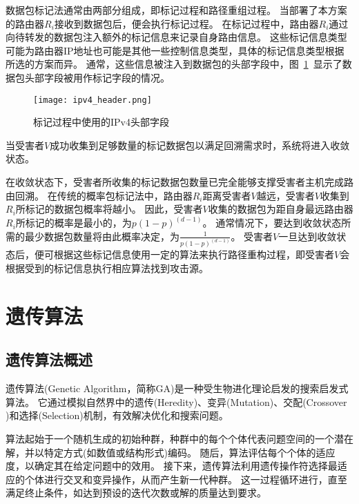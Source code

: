 


数据包标记法通常由两部分组成，即标记过程和路径重组过程。
当部署了本方案的路由器$R_i$接收到数据包后，便会执行标记过程。
在标记过程中，路由器$R_i$通过向待转发的数据包注入额外的标记信息来记录自身路由信息。
这些标记信息类型可能为路由器IP地址也可能是其他一些控制信息类型，具体的标记信息类型根据所选的方案而异。
通常，这些信息被注入到数据包的头部字段中，图~\ref{fig:ipv4_header}~显示了数据包头部字段被用作标记字段的情况。
\begin{figure}[htbp]
  \centering
  \texttt{[image: ipv4\_header.png]}
  \caption{标记过程中使用的IPv4头部字段}
  \label{fig:ipv4_header}
\end{figure}
当受害者$V$成功收集到足够数量的标记数据包以满足回溯需求时，系统将进入收敛状态。



在收敛状态下，受害者所收集的标记数据包数量已完全能够支撑受害者主机完成路由回溯。
在传统的概率包标记法中，路由器$R_i$距离受害者$V$越远，受害者$V$收集到$R_i$所标记的数据包概率将越小。
因此，受害者$V$收集的数据包为距自身最远路由器$R_i$所标记的概率是最小的，为$p(1-p)^(d-1)$。
通常情况下，要达到收敛状态所需的最少数据包数量将由此概率决定，为$\frac{1}{p(1-p)^(d-1)}$。
受害者$V$一旦达到收敛状态后，便可根据这些标记信息使用一定的算法来执行路径重构过程，即受害者$V$会根据受到的标记信息执行相应算法找到攻击源。

\section{遗传算法}
\label{sec:GA}
\subsection{遗传算法概述}
遗传算法(Genetic Algorithm，简称GA)\cite{zhou2006matlab}是一种受生物进化理论启发的搜索启发式算法。
它通过模拟自然界中的遗传(Heredity)、变异(Mutation)、交配(Crossover )和选择(Selection)机制，有效解决优化和搜索问题。\par

算法起始于一个随机生成的初始种群，种群中的每个个体代表问题空间的一个潜在解，并以特定方式(如数值或结构形式)编码。
随后，算法评估每个个体的适应度，以确定其在给定问题中的效用。
接下来，遗传算法利用遗传操作符选择最适应的个体进行交叉和变异操作，从而产生新一代种群。
这一过程循环进行，直至满足终止条件，如达到预设的迭代次数或解的质量达到要求。

